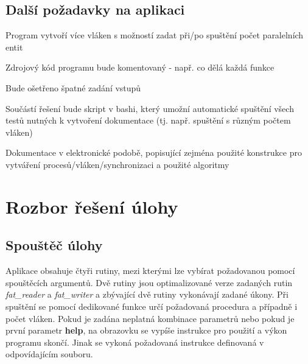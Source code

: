 \documentclass[12pt,a4paper]{article}
\let\oldsection\section
\renewcommand\section{\clearpage\oldsection}
\begin{document}
\subsection{Další požadavky na aplikaci}
\begin{description}
\item Program vytvoří více vláken s možností zadat při/po spuštění počet paralelních entit
\item Zdrojový kód programu bude komentovaný - např. co dělá každá funkce
\item Bude ošetřeno špatné zadání vstupů
\item Součástí řešení bude skript v bashi, který umožní automatické spuštění všech testů nutných k vytvoření dokumentace (tj. např. spuštění s různým počtem vláken)
\item Dokumentace v elektronické podobě, popisující zejména použité konstrukce pro vytváření procesů/vláken/synchronizaci a použité algoritmy
\item
\end{description}

\section{Rozbor řešení úlohy}
\subsection{Spouštěč úlohy}
Aplikace obsahuje čtyři rutiny, mezi kterými lze vybírat požadovanou pomocí spouštěcích argumentů. Dvě rutiny jsou optimalizované verze zadaných rutin \textit{fat\_reader} a \textit{fat\_writer} a zbývající dvě rutiny vykonávají zadané úkony. Při spuštění se pomocí dedikované funkce určí požadovaná procedura a případně i počet vláken. Pokud je zadána neplatná kombinace parametrů nebo pokud je první parametr \textbf{help}, na obrazovku se vypíše instrukce pro použití a výkon programu skončí. Jinak se vykoná požadovaná instrukce definovaná v odpovídajícím souboru.
\end{document}
